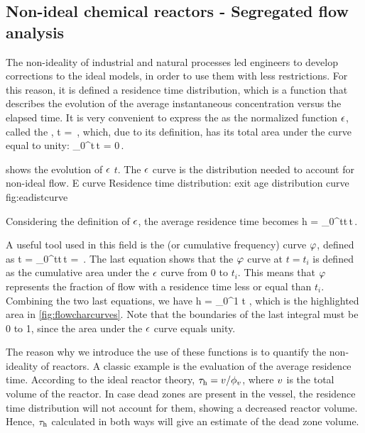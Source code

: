 \subsection{Non-ideal chemical reactors - Segregated flow analysis}
The non-ideality of industrial and natural processes led engineers to develop corrections to the ideal models, in order to use them with less restrictions. For this reason, it is defined a residence time distribution, which is a function that describes the evolution of the average instantaneous concentration versus the elapsed time. It is very convenient to express the  as the normalized function $\epsilon$, called the ,
\beq
\eadist\vat t = \,,
\eeq
which, due to its definition, has its total area under the curve equal to unity:
\beq
\int_0^\infty\eadist\vat t\,\dx t = 0\,.
\eeq

 shows the evolution of $\epsilon$ \vs $t$. The $\epsilon$ curve is the distribution needed to account for non-ideal flow.
%
   {E curve}
   {Residence time distribution: exit age distribution curve}%
   {fig:eadistcurve}%

Considering the definition of $\epsilon$, the average residence time becomes
\beq
\rtime\txt h = \int_0^\infty t\eadist\vat t\,\dx t\,.
\eeq

A useful tool used in this field is the  (or cumulative frequency) curve $\varphi$, defined as
\beq
\crtfrac\vat t = \int_0^\infty t\eadist\vat t\,\dx t 
               = \,.
\eeq
The last equation shows that the $\varphi$ curve at $t = t_i$ is defined as the cumulative area under the $\epsilon$ curve from 0 to $t_i$. This means that $\varphi$ represents the fraction of flow with a residence time less or equal than $t_i$. Combining the two last equations, we have
\beq
\rtime\txt h = \int_0^1 t\,\dx\crtfrac\,,
\eeq
which is the highlighted area in \cref{fig:flowcharcurves}. Note that the boundaries of the last integral must be 0 to 1, since the area under the $\epsilon$ curve equals unity.

The reason why we introduce the use of these functions is to quantify the non-ideality of reactors. A classic example is the evaluation of the average residence time. According to the ideal reactor theory, $\tau_\text{h} = v/\phi_{v}$, where $v$ is the total volume of the reactor. In case dead zones are present in the vessel, the residence time distribution will not account for them, showing a decreased reactor volume. Hence, $\tau_\text{h}$ calculated in both ways will give an estimate of the dead zone volume.

